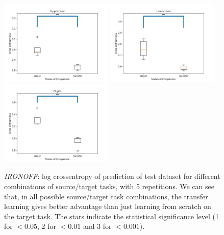       \begin{figure}
        \centering
          \includegraphics[width=0.48\textwidth]{images/sota/ironoff_results/Uppercase.png}\quad
          \includegraphics[width=0.48\textwidth]{images/sota/ironoff_results/Lowercase.png}\quad
          \includegraphics[width=0.48\textwidth]{images/sota/ironoff_results/Digits.png}
        \caption[\textit{IRONOFF} - log crossentropy of prediction results for different tasks]{\textit{IRONOFF}: log crossentropy of prediction of test dataset for different combinations of source/target tasks, with 5 repetitions. We can see that, in all possible source/target task combinations, the transfer learning gives better advantage than just learning from scratch on the target task. The stars indicate the statistical significance level (1 for $<0.05$, 2 for $<0.01$ and 3 for $<0.001$).}
        \label{fig:ironoff_crossentropy}
      \end{figure}

